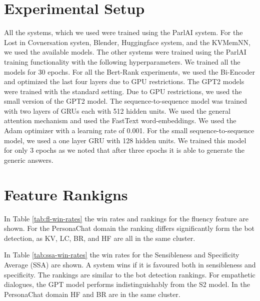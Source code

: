 \documentclass[11pt,a4paper]{article}
\begin{document}
\section{Experimental Setup}
\label{app:experiments}
All the systems, which we used were trained using the ParlAI system. For the Lost in Covnersation systen, Blender, Huggingface system, and the KVMemNN, we used the available models. The other systems were trained using the ParlAI training functionality with the following hyperparameters. We trained all the models for 30 epochs.
For all the Bert-Rank experiments, we used the Bi-Encoder and optimized the last four layers due to GPU restrictions. 
The GPT2 models were trained with the standard setting. Due to GPU restrictions, we used the small version of the GPT2 model. 
The sequence-to-sequence model was trained with two layers of GRUs \cite{cho2014gru} each with 512 hidden units. We used the general attention mechanism \cite{luong-etal-2015-effective} and used the FastText word-embeddings\cite{bojanowski-etal-2017-enriching}. We used the Adam optimizer \cite{kingma2014adam} with a learning rate of 0.001. 
For the small sequence-to-sequence model, we used a one layer GRU with 128 hidden units. We trained this model for only 3 epochs as we noted that after three epochs it is able to generate the generic answers. 

\section{Feature Rankigns}


In Table \ref{tab:fl-win-rates} the win rates and rankings for the fluency feature are shown. For the PersonaChat domain the ranking differs significantly form the bot detection, as KV, LC, BR, and HF are all in the same cluster. 

In Table \ref{tab:ssa-win-rates} the win rates for the Sensibleness and
Specificity Average (SSA) are shown. A system wins if it is favoured both in sensibleness and specificity. The rankings are similar to the bot detection rankings. For empathetic dialogues, the GPT model performs indistinguishably from the S2 model. In the PersonaChat domain HF and BR are in the same cluster. 
\end{document}
